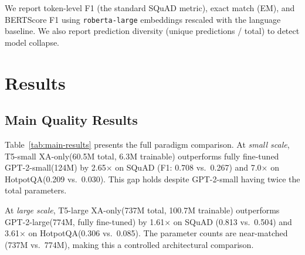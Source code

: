 \documentclass[11pt]{article}
\newcommand{\gptsmall}{GPT-2-small\xspace}
\newcommand{\gptlarge}{GPT-2-large\xspace}
\newcommand{\xaonly}{XA-only\xspace}
\newcommand{\squad}{SQuAD\xspace}
\newcommand{\hotpotqa}{HotpotQA\xspace}
\begin{document}
We report token-level F1 (the standard \squad metric), exact match (EM),
and BERTScore F1 \citep{zhang2020bertscore} using \texttt{roberta-large}
embeddings rescaled with the language baseline.
We also report prediction diversity (unique predictions / total) to detect
model collapse.

\section{Results}

\subsection{Main Quality Results}
\label{sec:main-results}

Table~\ref{tab:main-results} presents the full paradigm comparison.
At \emph{small scale}, T5-small \xaonly (60.5M total, 6.3M trainable)
outperforms fully fine-tuned \gptsmall (124M) by 2.65$\times$ on \squad
(F1: 0.708 vs.\ 0.267) and 7.0$\times$ on \hotpotqa (0.209 vs.\ 0.030).
This gap holds despite GPT-2-small having twice the total parameters.

At \emph{large scale}, T5-large \xaonly (737M total, 100.7M trainable)
outperforms \gptlarge (774M, fully fine-tuned) by 1.61$\times$ on \squad
(0.813 vs.\ 0.504) and 3.61$\times$ on \hotpotqa (0.306 vs.\ 0.085).
The parameter counts are near-matched (737M vs.\ 774M), making this a
controlled architectural comparison.
\end{document}
